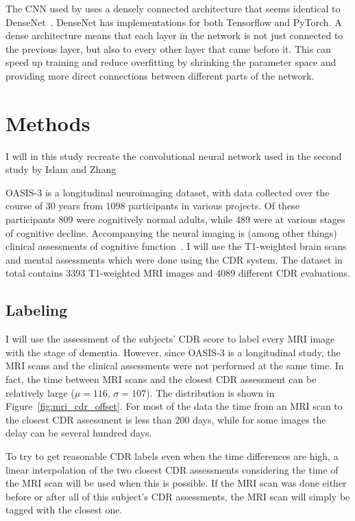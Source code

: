 \documentclass{kththesis}
\begin{document}
The CNN used by \textcite{islam2018early} uses a densely connected architecture that seems identical to DenseNet~\cite{huang2017densely}. DenseNet has implementations for both Tensorflow and PyTorch. A dense architecture means that each layer in the network is not just connected to the previous layer, but also to every other layer that came before it. This can speed up training and reduce overfitting by shrinking the parameter space and providing more direct connections between different parts of the network.

\chapter{Methods}

I will in this study recreate the convolutional neural network used in the second study by Islam and Zhang

OASIS-3 is a longitudinal neuroimaging dataset, with data collected over the course of 30 years from 1098 participants in various projects. Of these participants 809 were cognitively normal adults, while 489 were at various stages of cognitive decline. Accompanying the neural imaging is (among other things) clinical assessments of cognitive function~\cite{oasis3}. I will use the T1-weighted brain scans and mental assessments which were done using the CDR system. The dataset in total contains 3393 T1-weighted MRI images and 4089 different CDR evaluations.

\section{Labeling}
I will use the assessment of the subjects' CDR score to label every MRI image with the stage of dementia. However, since OASIS-3 is a longitudinal study, the MRI scans and the clinical assessments were not performed at the same time. In fact, the time between MRI scans and the closest CDR assessment can be relatively large ($\mu=116$, $\sigma=107$). The distribution is shown in Figure~\ref{fig:mri_cdr_offset}. For most of the data the time from an MRI scan to the closest CDR assessment is less than 200 days, while for some images the delay can be several hundred days.

To try to get reasonable CDR labels even when the time differences are high, a linear interpolation of the two closest CDR assessments considering the time of the MRI scan will be used when this is possible. If the MRI scan was done either before or after all of this subject's CDR assessments, the MRI scan will simply be tagged with the closest one.
\end{document}
